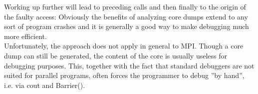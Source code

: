 Working up further will lead to preceding calls and then finally to the origin of the faulty access:
Obviously the benefits of analyzing core dumps extend to any sort of program crashes and it is generally a good way to make debugging much more efficient.\\
Unfortunately, the approach does not apply in general to MPI. Though a core dump can still be generated, the content of the core is usually useless for debugging purposes. This, together with the fact that standard debuggers are not suited for parallel programs, often forces the programmer to debug ''by hand'', i.e. via cout and Barrier().


